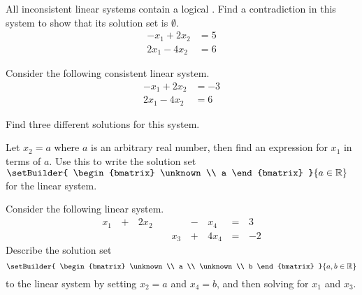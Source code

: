 \begin{activity}{10}
  All inconsistent linear systems contain a logical .
  Find a contradiction in this system to show that its solution set
  is \(\emptyset\).
  \begin{align*}
  -x_1+2x_2  &=  5 \\
  2x_1-4x_2  &=  6
  \end{align*}
\end{activity}

\begin{activity}{10}
  Consider the following consistent linear system.
  \begin{align*}
  -x_1+2x_2  &= -3 \\
  2x_1-4x_2  &=  6
  \end{align*}
\begin{subactivity}
  Find three different solutions
  for this system.
\end{subactivity}
\begin{subactivity}
  Let \(x_2=a\) where \(a\) is an arbitrary real number, then find an
  expression for \(x_1\) in terms of \(a\). Use this to write
  the solution set
  \(
    \setBuilder
    {
    	\begin{bmatrix}
        \unknown \\
        a
      \end{bmatrix}
    }{
      a \in \IR
	  }
  \)
  for the linear system.
\end{subactivity}
\end{activity}

\begin{activity}{10}
  Consider the following linear system.
  \begin{alignat*}{5}
    x_1 &\,+\,& 2x_2 &\, \,&     &\,-\,&  x_4 &\,=\,& 3 \\
        &\, \,&      &\, \,& x_3 &\,+\,& 4x_4 &\,=\,& -2
  \end{alignat*}
  Describe the solution set
  \[
  	\setBuilder
    {
    	\begin{bmatrix}
          \unknown \\
          a \\
          \unknown \\
          b
    	\end{bmatrix}
    }{
      a,b \in \IR
    }
  \]
  to the linear system
  by setting \(x_2=a\) and \(x_4=b\), and then solving for \(x_1\) and
  \(x_3\).
\end{activity}

